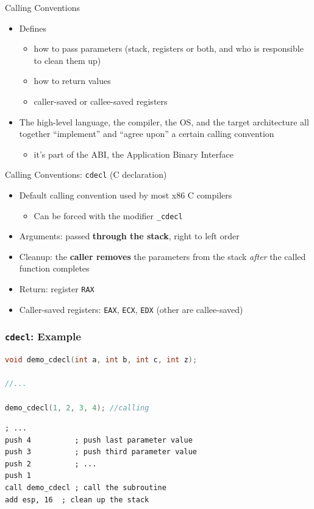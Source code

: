 \documentclass[]{beamer}
\begin{document}
\begin{frame}{Calling Conventions}
  \begin{itemize}
  	\item Defines
		\begin{itemize}
		\item how to pass parameters (stack, registers or both, and who is responsible to clean them up)
		\item how to return values
		\item caller-saved or callee-saved registers
		\end{itemize}
	\item The high-level language, the compiler, the OS, and the target architecture all together ``implement'' and ``agree upon'' a certain calling convention
    \begin{itemize}
    	\item it's part of the \alert{ABI}, the Application Binary Interface
    \end{itemize}
 \end{itemize}
\end{frame}


\begin{frame}{Calling Conventions: {\tt cdecl} (C declaration)}
  \begin{itemize}
  \item Default calling convention used by most x86 C compilers
  \begin{itemize}
  	\item Can be forced with the modifier \alert{\tt \_cdecl}
  \end{itemize}
  \item Arguments: passed \textbf{through the stack}, right to left order
  \item Cleanup: the \textbf{caller removes} the parameters from the stack \emph{after} the called function completes
  \item Return: register {\tt RAX}
  \item Caller-saved registers: {\tt EAX}, {\tt ECX}, {\tt EDX} (other are callee-saved)
  \end{itemize}
\end{frame}
\begin{frame}[fragile]
  \frametitle{{\tt cdecl}: Example}
\begin{lstlisting}[language=C]
void demo_cdecl(int a, int b, int c, int z);

//...

demo_cdecl(1, 2, 3, 4); //calling
\end{lstlisting}

\begin{lstlisting}[language={[x86masm]Assembler}]
; ...
push 4          ; push last parameter value
push 3          ; push third parameter value
push 2          ; ...
push 1
call demo_cdecl ; call the subroutine
add esp, 16  ; clean up the stack
\end{lstlisting}

\end{frame}
\end{document}
